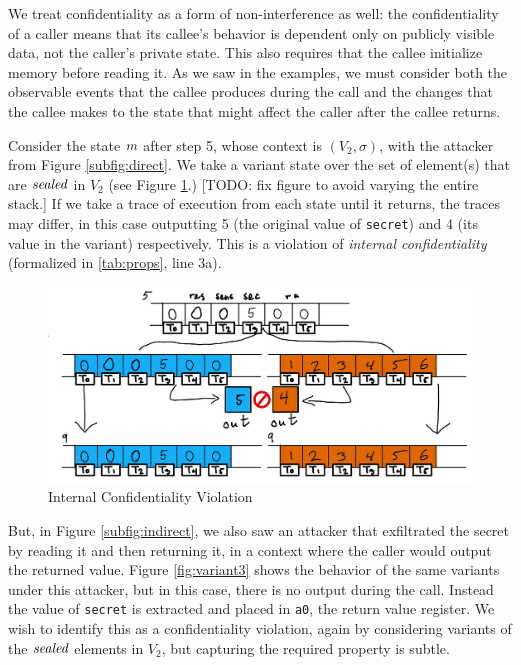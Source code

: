 \documentclass[10pt,conference]{ieeetran}%
\theoremstyle{definition}
\begin{document}
We treat confidentiality as a form of non-interference as well: the confidentiality of a caller
means that its callee's behavior is dependent only on publicly visible data,
not the caller's private state. This also requires that the callee initialize
memory before reading it.
As we saw in the examples, we must consider both the observable events
that the callee produces during the call and the changes that the callee makes to the state that might
affect the caller after the callee returns.

Consider the state \(m\) after step 5, whose context is \((V_2,\sigma)\), with the attacker from
Figure \ref{subfig:direct}. We take a variant state over the set of element(s) that are
\(\mathit{sealed}\) in \(V_2\) (see Figure \ref{fig:variant2}.)
            [TODO: fix figure to avoid varying the entire stack.]
If we take a trace of execution from each state until it returns,
the traces may differ, in this case outputting 5 (the original value of {\tt secret}) and
4 (its value in the variant) respectively. This is a violation of
{\it internal confidentiality} (formalized in \cref{tab:props}, line 3a).

\begin{figure}
  \includegraphics[width=\columnwidth]{variants2.png}
  \caption{Internal Confidentiality Violation}
  \label{fig:variant2}
\end{figure}

But, in Figure \ref{subfig:indirect}, we also saw an attacker that exfiltrated the secret
by reading it and then returning it, in a context where the caller would output the returned
value. Figure \ref{fig:variant3} shows the behavior of the same variants under this attacker,
but in this case, there is no output during the call. Instead the value of {\tt secret} is
extracted and placed in {\tt a0}, the return value register. We wish to identify this as
a confidentiality violation, again by considering variants of the \(\mathit{sealed}\)
elements in \(V_2\), but capturing the required property is subtle.
\end{document}
